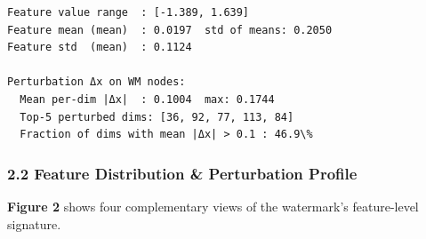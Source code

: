 \documentclass[11pt]{article}
\begin{document}
    \begin{Verbatim}[commandchars=\\\{\}]
Feature value range  : [-1.389, 1.639]
Feature mean (mean)  : 0.0197  std of means: 0.2050
Feature std  (mean)  : 0.1124

Perturbation Δx on WM nodes:
  Mean per-dim |Δx|  : 0.1004  max: 0.1744
  Top-5 perturbed dims: [36, 92, 77, 113, 84]
  Fraction of dims with mean |Δx| > 0.1 : 46.9\%
    \end{Verbatim}

    \subsubsection{2.2 Feature Distribution \& Perturbation
Profile}\label{feature-distribution-perturbation-profile}

\textbf{Figure 2} shows four complementary views of the watermark's
feature-level signature.
\end{document}
